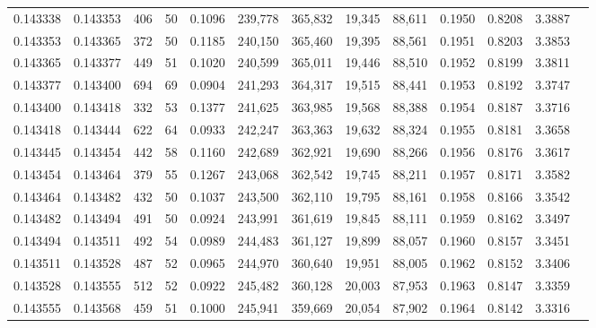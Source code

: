 \begin{tabular}{rrrrrrrrrrrrr}
0.143338 & 0.143353 &   406 &  50 &                                     0.1096 & 239,778 & 365,832 &  19,345 &  88,611 & 0.1950 & 0.8208 & 3.3887 \\
0.143353 & 0.143365 &   372 &  50 &                                     0.1185 & 240,150 & 365,460 &  19,395 &  88,561 & 0.1951 & 0.8203 & 3.3853 \\
0.143365 & 0.143377 &   449 &  51 &                                     0.1020 & 240,599 & 365,011 &  19,446 &  88,510 & 0.1952 & 0.8199 & 3.3811 \\
0.143377 & 0.143400 &   694 &  69 &                                     0.0904 & 241,293 & 364,317 &  19,515 &  88,441 & 0.1953 & 0.8192 & 3.3747 \\
0.143400 & 0.143418 &   332 &  53 &                                     0.1377 & 241,625 & 363,985 &  19,568 &  88,388 & 0.1954 & 0.8187 & 3.3716 \\
0.143418 & 0.143444 &   622 &  64 &                                     0.0933 & 242,247 & 363,363 &  19,632 &  88,324 & 0.1955 & 0.8181 & 3.3658 \\
0.143445 & 0.143454 &   442 &  58 &                                     0.1160 & 242,689 & 362,921 &  19,690 &  88,266 & 0.1956 & 0.8176 & 3.3617 \\
0.143454 & 0.143464 &   379 &  55 &                                     0.1267 & 243,068 & 362,542 &  19,745 &  88,211 & 0.1957 & 0.8171 & 3.3582 \\
0.143464 & 0.143482 &   432 &  50 &                                     0.1037 & 243,500 & 362,110 &  19,795 &  88,161 & 0.1958 & 0.8166 & 3.3542 \\
0.143482 & 0.143494 &   491 &  50 &                                     0.0924 & 243,991 & 361,619 &  19,845 &  88,111 & 0.1959 & 0.8162 & 3.3497 \\
0.143494 & 0.143511 &   492 &  54 &                                     0.0989 & 244,483 & 361,127 &  19,899 &  88,057 & 0.1960 & 0.8157 & 3.3451 \\
0.143511 & 0.143528 &   487 &  52 &                                     0.0965 & 244,970 & 360,640 &  19,951 &  88,005 & 0.1962 & 0.8152 & 3.3406 \\
0.143528 & 0.143555 &   512 &  52 &                                     0.0922 & 245,482 & 360,128 &  20,003 &  87,953 & 0.1963 & 0.8147 & 3.3359 \\
0.143555 & 0.143568 &   459 &  51 &                                     0.1000 & 245,941 & 359,669 &  20,054 &  87,902 & 0.1964 & 0.8142 & 3.3316 \\

\end{tabular}
